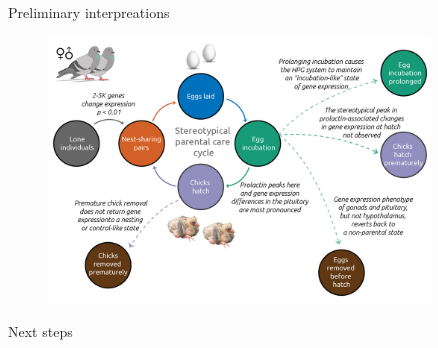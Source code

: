 \documentclass[final]{beamer}
\newlength{\sepwid}
\newlength{\onecolwid}
\newlength{\twocolwid}
\begin{document}
\begin{frame}[t]
\begin{columns}[t]
\begin{column}{\twocolwid}
\begin{columns}[t,totalwidth=\twocolwid]
\begin{column}{\onecolwid}
\vspace{1em}



\end{column} %

\end{columns} %

\end{column} %

\begin{column}{\sepwid}\end{column} %

\begin{column}{\onecolwid} %


\vspace{-0.5em}

\begin{block}{Preliminary interpreations}

\begin{figure}
\includegraphics[width=1\linewidth]{DoveParentsRNAseq_summary.png}
\end{figure}

\end{block}

\begin{block}{Next steps}


\end{block}
\end{column}
\end{columns}
\end{frame}
\end{document}
